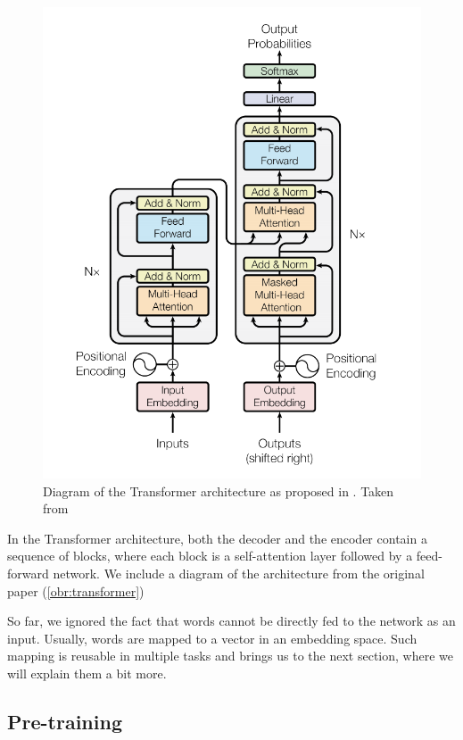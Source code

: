 \begin{figure}[h]\centering
\includegraphics[scale=0.7]{./img/transformer}
\caption{Diagram of the Transformer architecture as proposed in \cite{vaswani2017attention}. Taken from \cite{vaswani2017attention}}
\label{obr:transformer}
\end{figure}


In the Transformer architecture, both the decoder and the encoder contain a sequence of blocks, where each block is a self-attention layer followed by a feed-forward network. We include a diagram of the architecture from the original paper (\autoref{obr:transformer})



So far, we ignored the fact that words cannot be directly fed to the network as an input. Usually, words are mapped to a vector in an embedding space. Such mapping is reusable in multiple tasks and brings us to the next section, where we will explain them a bit more.
 
\subsection{Pre-training}

